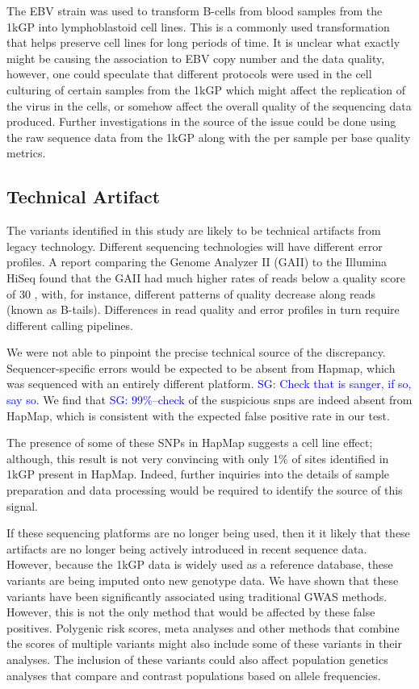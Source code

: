 \documentclass[9pt,lineno]{elife}
\newcommand{\sgcomment}[1]{\textcolor{blue}{SG: #1}}
\begin{document}
The EBV strain was used to transform B-cells from blood samples from the 1kGP into lymphoblastoid cell lines.
This is a commonly used transformation that helps preserve cell lines for long periods of time.
It is unclear what exactly might be causing the association to EBV copy number and the data quality, however, one could speculate that different protocols were used in the cell culturing of certain samples from the 1kGP which might affect the replication of the virus in the cells, or somehow affect the overall quality of the sequencing data produced.
Further investigations in the source of the issue could be done using the raw sequence data from the 1kGP along with the per sample per base quality metrics. 			

\subsection{Technical Artifact}
The variants identified in this study are likely to be technical artifacts from legacy technology.
Different sequencing technologies will have different error profiles. 
A report comparing the Genome Analyzer II (GAII) to the Illumina HiSeq found that the GAII had much higher rates of reads below a quality score of 30 \citep{Minoche2011}, with, for instance, different patterns of quality decrease along reads (known as B-tails). 
Differences in read quality and error profiles in turn require different calling pipelines.

We were not able to pinpoint the precise technical source of the discrepancy. Sequencer-specific errors would be expected to be absent from Hapmap, which was sequenced with an entirely different platform. \sgcomment{Check that is sanger, if so, say so}. We find that \sgcomment{$99\%$--check} of the suspicious snps are indeed absent from HapMap, which is consistent with the expected false positive rate in our test.   
  
The presence of some of these SNPs in HapMap suggests a cell line effect; although, this result is not very convincing with only 1\% of sites identified in 1kGP present in HapMap.
Indeed, further inquiries into the details of sample preparation and data processing would be required to identify the source of this signal. 

If these sequencing platforms are no longer being used, then it it likely that these artifacts are no longer being actively introduced in recent sequence data.
However, because the 1kGP data is widely used as a reference database, these variants are being imputed onto new genotype data.
We have shown that these variants have been significantly associated using traditional GWAS methods.
However, this is not the only method that would be affected by these false positives. 
Polygenic risk scores, meta analyses and other methods that combine the scores of multiple variants might also include some of these variants in their analyses.
The inclusion of these variants could also affect population genetics analyses that compare and contrast populations based on allele frequencies.
\end{document}
